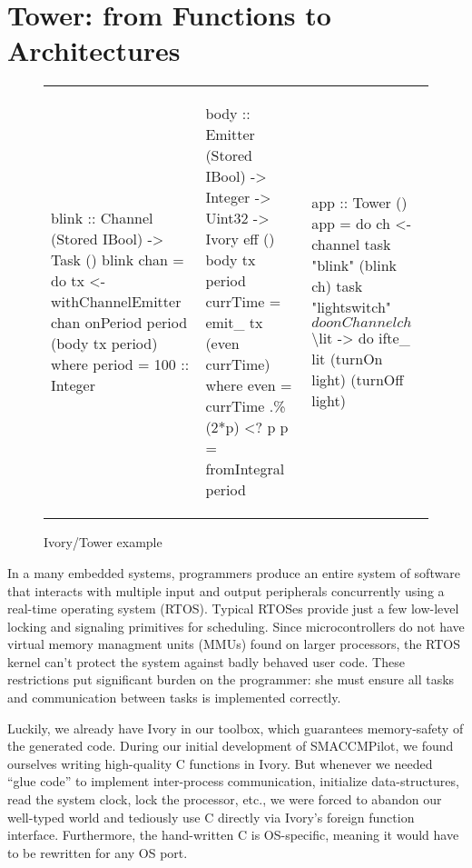 \section{Tower: from Functions to Architectures}
\label{sec:tower}

\begin{figure*}
  \begin{tabular}{p{}|p{}|p{}}
    \begin{smcode}

blink :: Channel (Stored IBool)
      -> Task ()
blink chan = do
  tx <- withChannelEmitter chan
  onPeriod period (body tx period)
  where
  period = 100 :: Integer
    \end{smcode} & \begin{smcode}
body :: Emitter (Stored IBool)
     -> Integer
     -> Uint32
     -> Ivory eff ()
body tx period currTime =
  emit\_ tx (even currTime)
  where
  even = currTime .\% (2*p) <? p
  p    = fromIntegral period
    \end{smcode} & \begin{smcode}
app :: Tower ()
app = do
  ch <- channel
  task "blink" (blink ch)
  task "lightswitch" $ do
    onChannel ch $ \textbackslash{}lit -> do
      ifte\_ lit (turnOn light)
                (turnOff light)
    \end{smcode}
  \end{tabular}
  \caption{Ivory/Tower example}
  \label{fig:tower-ex}
\end{figure*}

In a many embedded systems, programmers produce an entire system of software
that interacts with multiple input and output peripherals concurrently using a
real-time operating system (RTOS). Typical RTOSes provide just a few low-level
locking and signaling primitives for scheduling. Since microcontrollers do not
have virtual memory managment units (MMUs) found on larger processors, the RTOS
kernel can't protect the system against badly behaved user code. These
restrictions put significant burden on the programmer: she must ensure all tasks
and communication between tasks is implemented correctly.

Luckily, we already have Ivory in our toolbox, which guarantees memory-safety of
the generated code. During our initial development of SMACCMPilot, we found
ourselves writing high-quality C functions in Ivory.  But whenever we needed
``glue code'' to implement inter-process communication, initialize
data-structures, read the system clock, lock the processor, etc., we were forced
to abandon our well-typed world and tediously use C directly via Ivory's foreign
function interface.  Furthermore, the hand-written C is OS-specific, meaning it
would have to be rewritten for any OS port.

